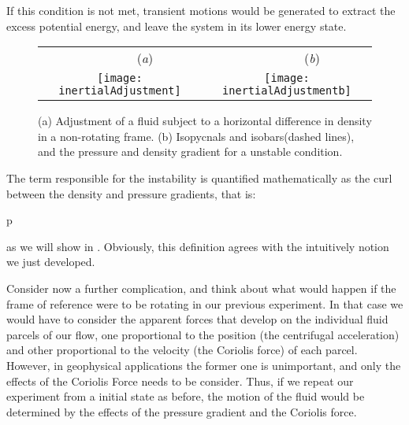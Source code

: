If this condition is not met, transient motions would be generated to extract the excess  potential energy, and leave the system in its lower energy state.

\begin{figure}[t]
\begin{center}
 \begin{tabular}{cc}
        ~~~~~~~~(\textit{a})                        &   ~~~~~~~~(\textit{b}) \\
    \texttt{[image: inertialAdjustment]}
    & \texttt{[image: inertialAdjustmentb]}

  \end{tabular}
\end{center}
\caption{
(a) Adjustment of a fluid subject to a horizontal difference in density in a non-rotating frame.
(b) Isopycnals and isobars(dashed lines), and the pressure and density gradient for a unstable condition.
        }
\label{f:drivedrag}
\end{figure}

The term responsible for the instability is quantified mathematically as the curl between the density and pressure gradients, that is:

\beq
\nabla \rho \times \nabla p

as we will show in . Obviously, this definition
agrees with the intuitively notion we just developed.

Consider now a further complication, and think about what would happen if
the frame of reference were to be rotating in our previous experiment. In
that case we would have to consider the apparent forces that develop on
the individual fluid parcels of our flow, one proportional to the
position (the centrifugal acceleration) and other proportional to the
velocity (the Coriolis force) of each parcel. However, in geophysical
applications the former one is unimportant, and only the
effects of the Coriolis Force needs to be consider. Thus, if we repeat
our experiment from a initial state as before, the motion of the fluid
would be determined by the effects of the pressure gradient and the
Coriolis force.


